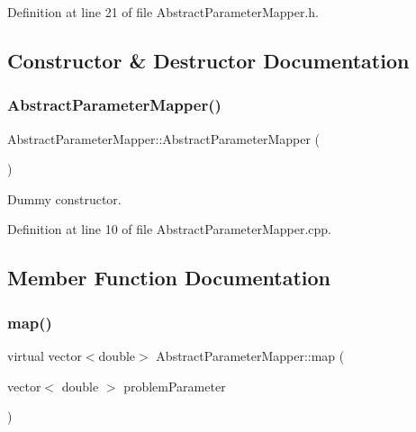 Definition at line 21 of file Abstract\+Parameter\+Mapper.\+h.



\subsection{Constructor \& Destructor Documentation}
\mbox{\label{classAbstractParameterMapper_ae8e7c815952e44d47bc406f396fdf0d6}} 
\subsubsection{\texorpdfstring{Abstract\+Parameter\+Mapper()}{AbstractParameterMapper()}}
{\footnotesize\ttfamily Abstract\+Parameter\+Mapper\+::\+Abstract\+Parameter\+Mapper (\begin{DoxyParamCaption}{ }\end{DoxyParamCaption})}

Dummy constructor. 

Definition at line 10 of file Abstract\+Parameter\+Mapper.\+cpp.



\subsection{Member Function Documentation}
\mbox{\label{classAbstractParameterMapper_abb9e78545ff023f2b786b759ec2d23e4}} 
\subsubsection{\texorpdfstring{map()}{map()}}
{\footnotesize\ttfamily virtual vector$<$double$>$ Abstract\+Parameter\+Mapper\+::map (\begin{DoxyParamCaption}\item[{vector$<$ double $>$}]{problem\+Parameter }\end{DoxyParamCaption})\hspace{0.3cm}{\ttfamily [pure virtual]}}

